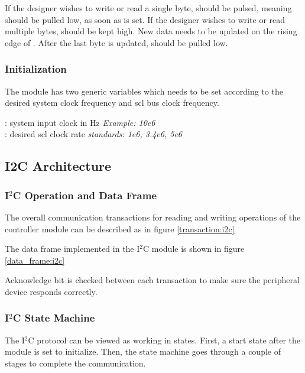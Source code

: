 If the designer wishes to write or read a single byte,  should be pulsed, meaning  should be pulled low, as soon as  is set. If the designer wishes to write or read multiple bytes,  should be kept high. New data needs to be updated on the rising edge of . After the last byte is updated,  should be pulled low.

\subsubsection{Initialization}
The module has two generic variables which needs to be set according to the desired system clock frequency and scl bus clock frequency. 

\noindent {} : system input clock in Hz \textit{Example: 10e6}\\
 : desired scl clock rate \textit{standards: 1e6, 3.4e6, 5e6}

\newpage
\subsection{I2C Architecture}
\subsubsection{I$^2$C Operation and Data Frame}
The overall communication transactions for reading and writing operations of the controller module can be described as in figure \ref{transaction:i2c}



The data frame implemented in the I$^2$C module is shown in figure \ref{data_frame:i2c}


Acknowledge bit is checked between each transaction to make sure the peripheral device responds correctly.

\newpage
\subsubsection{I$^2$C State Machine}
The I$^2$C protocol can be viewed as working in states. First, a start state after the module is set to initialize. Then, the state machine goes through a couple of stages to complete the communication. 

